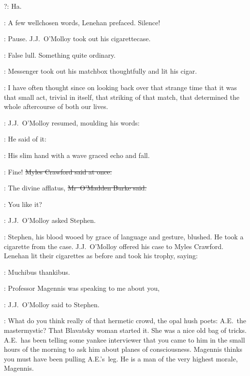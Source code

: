 \crawford?:
Ha.

\lenehan:
A few wellchosen words,
Lenehan prefaced.
Silence!

:
Pause.
J.J.~O'Molloy took out his cigarettecase.

\StephenInt:
False lull.
Something quite ordinary.

\StephenInt:
Messenger took out his matchbox thoughtfully and lit his cigar.

\StephenInt:
I have often thought since
on looking back over that strange time
that it was that small act,
trivial in itself,
that striking of that match,
that determined the whole aftercourse of both our lives.



:
J.J.~O'Molloy resumed,
moulding his words:

\jjom:
He said of it:
\stage{[Bushe]}

:
His slim hand with a wave graced echo and fall.

\crawford:
Fine!
\sout{Myles Crawford said at once.}

\omaddenburke:
The divine afflatus,
\sout{Mr~O'Madden Burke said.}

\jjom:
You like it?

:
J.J.~O'Molloy asked Stephen.

:
Stephen,
his blood wooed by grace of language and gesture,
blushed.
He took a cigarette from the case.
J.J.~O'Molloy offered his case to Myles Crawford.
Lenehan lit their cigarettes as before
and took his trophy,
saying:

\lenehan:
Muchibus thankibus.



\jjom:
Professor Magennis was speaking to me about you,

:
J.J.~O'Molloy said to Stephen.

\jjom:
What do you think really of that hermetic crowd,
the opal hush poets:
A.E.~the mastermystic?
That Blavatsky woman started it.
She was a nice old bag of tricks.
A.E.~has been telling some yankee interviewer
that you came to him in the small hours of the morning
to ask him about planes of consciousness.
Magennis thinks you must have been pulling A.E.'s~leg.
He is a man of the very highest morale,
Magennis.

